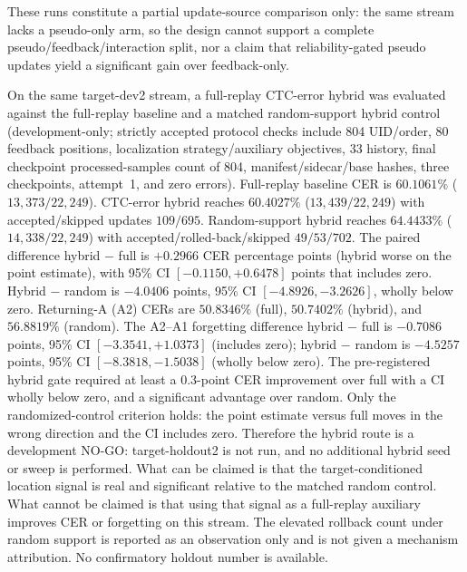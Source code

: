 These runs constitute a partial update-source comparison only: the same stream lacks a pseudo-only arm, so the design cannot support a complete pseudo/feedback/interaction split, nor a claim that reliability-gated pseudo updates yield a significant gain over feedback-only.

On the same target-dev2 stream, a full-replay CTC-error hybrid was evaluated against the full-replay baseline and a matched random-support hybrid control (development-only; strictly accepted protocol checks include 804 UID/order, 80 feedback positions, localization strategy/auxiliary objectives, 33 history, final checkpoint processed-samples count of 804, manifest/sidecar/base hashes, three checkpoints, attempt~1, and zero errors). Full-replay baseline CER is $60.1061\%$ ($13{,}373/22{,}249$). CTC-error hybrid reaches $60.4027\%$ ($13{,}439/22{,}249$) with accepted/skipped updates $109/695$. Random-support hybrid reaches $64.4433\%$ ($14{,}338/22{,}249$) with accepted/rolled-back/skipped $49/53/702$. The paired difference hybrid $-$ full is $+0.2966$ CER percentage points (hybrid worse on the point estimate), with 95\% CI $[-0.1150,+0.6478]$ points that includes zero. Hybrid $-$ random is $-4.0406$ points, 95\% CI $[-4.8926,-3.2626]$, wholly below zero. Returning-A (A2) CERs are $50.8346\%$ (full), $50.7402\%$ (hybrid), and $56.8819\%$ (random). The A2--A1 forgetting difference hybrid $-$ full is $-0.7086$ points, 95\% CI $[-3.3541,+1.0373]$ (includes zero); hybrid $-$ random is $-4.5257$ points, 95\% CI $[-8.3818,-1.5038]$ (wholly below zero). The pre-registered hybrid gate required at least a $0.3$-point CER improvement over full with a CI wholly below zero, and a significant advantage over random. Only the randomized-control criterion holds: the point estimate versus full moves in the wrong direction and the CI includes zero. Therefore the hybrid route is a development NO-GO: target-holdout2 is not run, and no additional hybrid seed or sweep is performed. What can be claimed is that the target-conditioned location signal is real and significant relative to the matched random control. What cannot be claimed is that using that signal as a full-replay auxiliary improves CER or forgetting on this stream. The elevated rollback count under random support is reported as an observation only and is not given a mechanism attribution. No confirmatory holdout number is available.

